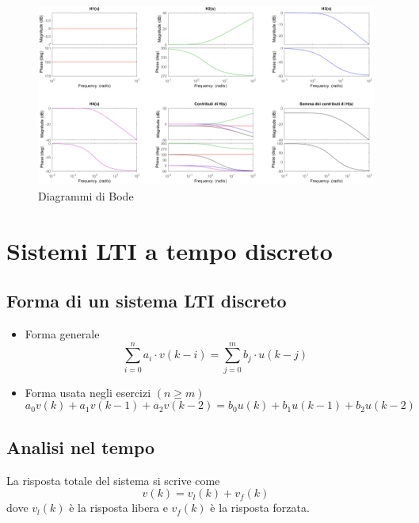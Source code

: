 \documentclass[a4paper,oneside,titlepage]{book}
\begin{document}
\begin{figure}[htp]
    \centering
    \includegraphics[width=\textwidth, height=\textheight, keepaspectratio]{bode.PNG}
    \caption{Diagrammi di Bode}
    \label{fig:bode}
\end{figure}


\chapter{Sistemi LTI a tempo discreto}

\section{Forma di un sistema LTI discreto}
\begin{itemize}
\item Forma generale
\[ \sum_{i=0}^n a_i \cdot v(k-i) = \sum_{j=0}^m b_j \cdot u(k-j) \]

\item Forma usata negli esercizi $(n \geq m)$
\[ a_0 v(k) + a_1 v(k-1) + a_2 v(k-2) = b_0 u(k) + b_1 u(k-1) + b_2 u(k-2) \]
\end{itemize}


\section{Analisi nel tempo}
La risposta totale del sistema si scrive come
\[ v(k) = v_l(k) + v_f(k) \]
dove $v_l(k)$ è la risposta libera e $v_f(k)$ è la risposta forzata.
\end{document}
